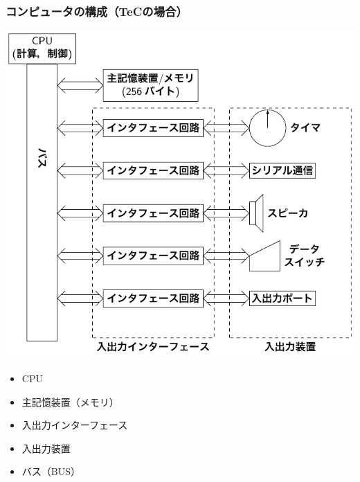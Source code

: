 \documentclass{beamer}                 %
\begin{document}
\begin{frame}
  \frametitle{コンピュータの構成（TeCの場合）}
  \begin{minipage}{0.59\columnwidth}
    \centerline{\includegraphics[scale=0.63]{../Tikz/kousei2.pdf}}
  \end{minipage}
  \begin{minipage}{0.4\columnwidth}
    \begin{itemize}
    \item CPU\\
      \vspace{5ex}
    \item 主記憶装置（メモリ）\\
      \vspace{5ex}
    \item 入出力インターフェース\\
      \vspace{4ex}
    \item 入出力装置\\
      \vspace{4ex}
    \item バス（BUS）\\
      \vspace{6ex}
    \end{itemize}
  \end{minipage}
\end{frame}
\end{document}
